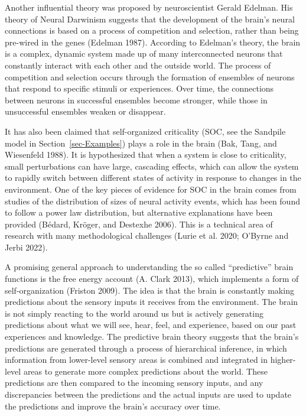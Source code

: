 \documentclass[
  a4paper,
  DIV=11,
  numbers=noendperiod,
  oneside]{scrreprt}
\begin{document}
Another influential theory was proposed by neuroscientist Gerald
Edelman. His theory of Neural Darwinism suggests that the development of
the brain's neural connections is based on a process of competition and
selection, rather than being pre-wired in the genes (Edelman 1987).
According to Edelman's theory, the brain is a complex, dynamic system
made up of many interconnected neurons that constantly interact with
each other and the outside world. The process of competition and
selection occurs through the formation of ensembles of neurons that
respond to specific stimuli or experiences. Over time, the connections
between neurons in successful ensembles become stronger, while those in
unsuccessful ensembles weaken or disappear.

It has also been claimed that self-organized criticality (SOC, see the
Sandpile model in Section~\ref{sec-Examples}) plays a role in the brain
(Bak, Tang, and Wiesenfeld 1988). It is hypothesized that when a system
is close to criticality, small perturbations can have large, cascading
effects, which can allow the system to rapidly switch between different
states of activity in response to changes in the environment. One of the
key pieces of evidence for SOC in the brain comes from studies of the
distribution of sizes of neural activity events, which has been found to
follow a power law distribution, but alternative explanations have been
provided (Bédard, Kröger, and Destexhe 2006). This is a technical area
of research with many methodological challenges (Lurie et al. 2020;
O'Byrne and Jerbi 2022).

A promising general approach to understanding the so called
``predictive'' brain functions is the free energy account (A. Clark
2013), which implements a form of self-organization (Friston 2009). The
idea is that the brain is constantly making predictions about the
sensory inputs it receives from the environment. The brain is not simply
reacting to the world around us but is actively generating predictions
about what we will see, hear, feel, and experience, based on our past
experiences and knowledge. The predictive brain theory suggests that the
brain's predictions are generated through a process of hierarchical
inference, in which information from lower-level sensory areas is
combined and integrated in higher-level areas to generate more complex
predictions about the world. These predictions are then compared to the
incoming sensory inputs, and any discrepancies between the predictions
and the actual inputs are used to update the predictions and improve the
brain's accuracy over time.
\end{document}
